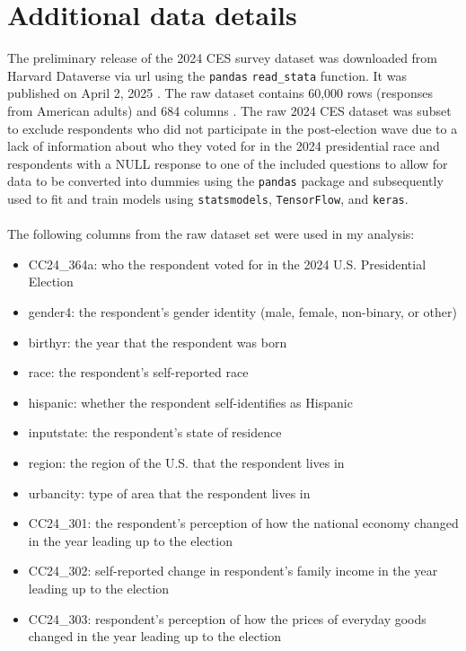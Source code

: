 \documentclass[letter]{article}
\begin{document}
\section{Additional data details} \label{appendix:a}
The preliminary release of the 2024 CES survey dataset was downloaded from Harvard Dataverse via url using the \texttt{pandas} \texttt{read\_stata} function. It was published on April 2, 2025 \cite{ces24}. The raw dataset contains 60,000 rows (responses from American adults) and 684 columns \cite{ces24}. The raw 2024 CES dataset was subset to exclude respondents who did not participate in the post-election wave due to a lack of information about who they voted for in the 2024 presidential race and respondents with a NULL response to one of the included questions to allow for data to be converted into dummies using the \texttt{pandas} package and subsequently used to fit and train models using \texttt{statsmodels}, \texttt{TensorFlow}, and \texttt{keras}. \\
\\
The following columns from the raw dataset set were used in my analysis: 
\begin{itemize}
    \item CC24\_364a: who the respondent voted for in the 2024 U.S. Presidential Election 
    \item gender4: the respondent's gender identity (male, female, non-binary, or other)
    \item birthyr: the year that the respondent was born 
    \item race: the respondent's self-reported race
    \item hispanic: whether the respondent self-identifies as Hispanic
    \item inputstate: the respondent's state of residence
    \item region: the region of the U.S. that the respondent lives in
    \item urbancity: type of area that the respondent lives in
    \item CC24\_301: the respondent's perception of how the national economy changed in the year leading up to the election
    \item CC24\_302: self-reported change in respondent's family income in the year leading up to the election
    \item CC24\_303: respondent's perception of how the prices of everyday goods changed in the year leading up to the election
\end{itemize}
\end{document}
